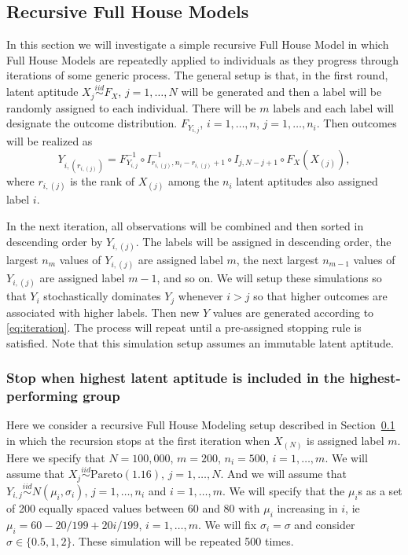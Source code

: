 \documentclass[12pt]{article}
\begin{document}
\subsection{Recursive Full House Models}
\label{sec:rFHMsetup}

In this section we will investigate a simple recursive Full House Model in which Full House Models are repeatedly applied to individuals as they progress through iterations of some generic process. The general setup is that, in the first round, latent aptitude $X_{j} \overset{iid}{\sim} F_X$, $j = 1,\ldots,N$ will be generated  and then a label will be randomly assigned to each individual. There will be $m$ labels and each label will designate the outcome distribution. $F_{Y_{i,j}}$, $i = 1,\ldots,n$, $j = 1,\ldots,n_i$. Then outcomes will be realized as
\begin{equation} \label{eq:iteration}
  Y_{i,(r_{i,(j)})} = F_{Y_{i,j}}^{-1} \circ I_{r_{i,(j)},n_i-r_{i,(j)}+1}^{-1} \circ I_{j,N-j+1} \circ  F_X (X_{(j)}),	
\end{equation}
where $r_{i,(j)}$ is the rank of $X_{(j)}$ among the $n_i$ latent aptitudes also assigned label $i$. 

In the next iteration, all observations will be combined and then sorted in descending order by $Y_{i,(j)}$. The labels will be assigned in descending order, the largest $n_m$ values of $Y_{i,(j)}$ are assigned label $m$, the next largest $n_{m-1}$ values of $Y_{i,(j)}$ are assigned label $m-1$, and so on. We will setup these simulations so that $Y_i$ stochastically dominates $Y_{j}$ whenever $i > j$ so that higher outcomes are associated with higher labels. Then new $Y$ values are generated according to \eqref{eq:iteration}. The process will repeat until a pre-assigned stopping rule is satisfied. Note that this simulation setup assumes an immutable latent aptitude.


\subsubsection{Stop when highest latent aptitude is included in the highest-performing group}
\label{sec:rFHMbestgroup}

Here we consider a recursive Full House Modeling setup described in Section~\ref{sec:rFHMsetup} in which the recursion stops at the first iteration when $X_{(N)}$ is assigned label $m$. Here we specify that $N = 100,000$, $m=200$, $n_i = 500$, $i = 1,\ldots,m$. We will assume that $X_j \overset{iid}{\sim} \text{Pareto}(1.16)$, $j = 1,\ldots,N$. And we will assume that $Y_{i,j} \overset{iid}{\sim} N(\mu_i,\sigma_i)$, $j = 1,\ldots,n_i$ and $i = 1,\ldots,m$. We will specify that the $\mu_i$s as a set of 200 equally spaced values between 60 and 80 with $\mu_i$ increasing in $i$, ie $\mu_i = 60 - 20/199 + 20i/199$, $i=1,\ldots,m$. %
We will fix $\sigma_i = \sigma$ and consider $\sigma \in \{0.5,1,2\}$. These simulation will be repeated 500 times.
\end{document}
